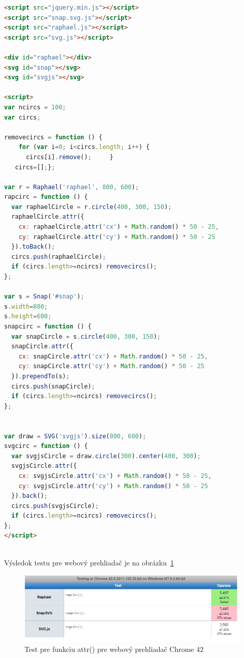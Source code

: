 \begin{lstlisting}[language = html]
<script src="jquery.min.js"></script>
<script src="snap.svg.js"></script>
<script src="raphael.js"></script>
<script src="svg.js"></script>

<div id="raphael"></div>
<svg id="snap"></svg>
<svg id="svgjs"></svg>

<script>
var ncircs = 100;
var circs;

removecircs = function () {
    for (var i=0; i<circs.length; i++) {
      circs[i].remove();     }
   circs=[];};

var r = Raphael('raphael', 800, 600);
rapcirc = function () {
  var raphaelCircle = r.circle(400, 300, 150);
  raphaelCircle.attr({
    cx: raphaelCircle.attr('cx') + Math.random() * 50 - 25,
    cy: raphaelCircle.attr('cy') + Math.random() * 50 - 25
  }).toBack();
  circs.push(raphaelCircle);
  if (circs.length>=ncircs) removecircs();
};

var s = Snap('#snap');
s.width=800;
s.height=600;
snapcirc = function () {
  var snapCircle = s.circle(400, 300, 150);
  snapCircle.attr({
    cx: snapCircle.attr('cx') + Math.random() * 50 - 25,
    cy: snapCircle.attr('cy') + Math.random() * 50 - 25
  }).prependTo(s);
  circs.push(snapCircle);
  if (circs.length>=ncircs) removecircs();
};


var draw = SVG('svgjs').size(800, 600);
svgcirc = function () {
  var svgjsCircle = draw.circle(300).center(400, 300);
  svgjsCircle.attr({
    cx: svgjsCircle.attr('cx') + Math.random() * 50 - 25,
    cy: svgjsCircle.attr('cy') + Math.random() * 50 - 25
  }).back();
  circs.push(svgjsCircle);
  if (circs.length>=ncircs) removecircs();
};
</script>
 
\end{lstlisting}

Výsledok testu pre webový prehliadač je na obrázku~\ref{fig:graf2}

 \begin{figure}[H]
\centering
\includegraphics[width=0.7\linewidth]{obrazky/test2.JPG}
\caption{Test pre funkciu attr() pre webový prehliadač Chrome 42}
\label{fig:graf2}
\end{figure}





